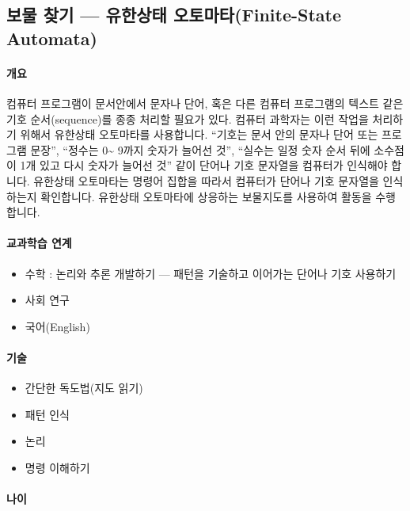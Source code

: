 \documentclass[]{article}
\begin{document}
\subsection{보물 찾기 --- 유한상태 오토마타(Finite-State
Automata)}\label{mdash--finite-state-automata}

\mbox{}\paragraph{개요}\label{section-154}

컴퓨터 프로그램이 문서안에서 문자나 단어, 혹은 다른 컴퓨터 프로그램의
텍스트 같은 기호 순서(sequence)를 종종 처리할 필요가 있다. 컴퓨터
과학자는 이런 작업을 처리하기 위해서 유한상태 오토마타를 사용합니다.
``기호는 문서 안의 문자나 단어 또는 프로그램 문장'', ``정수는
0\textasciitilde{} 9까지 숫자가 늘어선 것'', ``실수는 일정 숫자 순서
뒤에 소수점이 1개 있고 다시 숫자가 늘어선 것'' 같이 단어나 기호 문자열을
컴퓨터가 인식해야 합니다. 유한상태 오토마타는 명령어 집합을 따라서
컴퓨터가 단어나 기호 문자열을 인식하는지 확인합니다. 유한상태 오토마타에
상응하는 보물지도를 사용하여 활동을 수행합니다.

\mbox{}\paragraph{교과학습 연계}\label{section-155}

\begin{itemize}
\itemsep1pt\parskip0pt
\item
  수학 : 논리와 추론 개발하기 --- 패턴을 기술하고 이어가는 단어나 기호
  사용하기
\item
  사회 연구
\item
  국어(English)
\end{itemize}

\mbox{}\paragraph{기술}\label{section-156}

\begin{itemize}
\itemsep1pt\parskip0pt
\item
  간단한 독도법(지도 읽기)
\item
  패턴 인식
\item
  논리
\item
  명령 이해하기
\end{itemize}

\mbox{}\paragraph{나이}\label{section-157}
\end{document}
